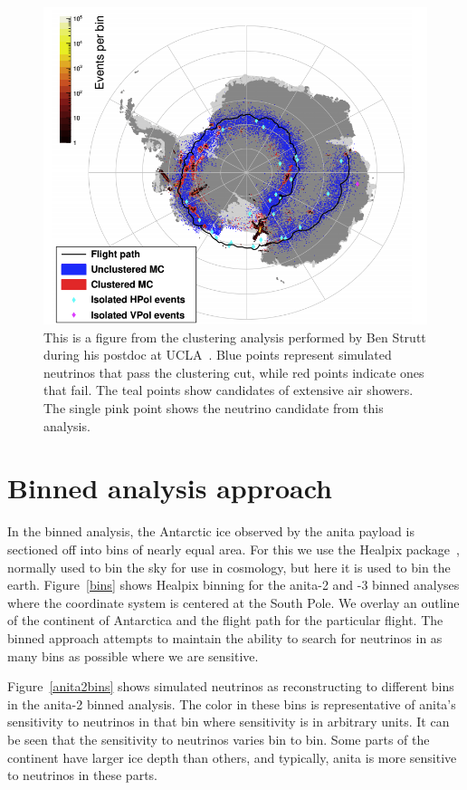 \begin{figure}
\centering
\includegraphics[width=1.0\textwidth]{figures/ben_clustering.png}
\caption{This is a figure from the clustering analysis performed by Ben Strutt during his postdoc at UCLA~\cite{diffuse}. Blue points represent simulated neutrinos that pass the clustering cut, while red points indicate ones that fail. The teal points show candidates of extensive air showers. The single pink point shows the neutrino candidate from this analysis.}
\label{ben_clustering}
\end{figure}

\section{Binned analysis approach} 

In the binned analysis, the Antarctic ice observed by the \gls{anita} payload is sectioned off into bins of nearly equal area.  
For this we use the Healpix package~\cite{healpix}, 
normally used to bin the sky for use
in cosmology, but here it is used to bin the earth.
Figure~\ref{bins} shows Healpix binning for the \gls{anita}-2 and -3 binned analyses where the coordinate
system is centered at the South Pole.
We overlay an outline of the continent of Antarctica and 
the flight path for the particular flight. The binned approach attempts to maintain the ability to search for neutrinos in as many bins as possible where we are sensitive.  

Figure~\ref{anita2bins} shows simulated neutrinos as reconstructing to different bins in the \gls{anita}-2 binned analysis. The color in these bins is representative of \gls{anita}'s sensitivity to neutrinos in that bin where sensitivity is in arbitrary units. It can be seen that the sensitivity to neutrinos varies bin to bin. Some parts of the continent have larger ice depth than others, and typically, \gls{anita} is more sensitive to neutrinos in these parts. 

